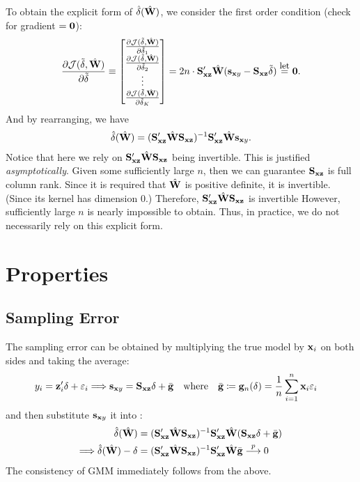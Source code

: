 \documentclass{article}
\begin{document}
To obtain the explicit form of $\hat{\delta}(\hat{\mathbf{W}})$,
we consider the first order condition (check for gradient $=\mathbf{0}$):
\begin{align*}
	\frac{\partial{\mathcal{J}(\tilde{\delta},\hat{\mathbf{W}})}}{\partial{\tilde{\delta}}}
	\equiv
	\begin{bmatrix}
		\frac{\partial{\mathcal{J}(\tilde{\delta},\hat{\mathbf{W}})}}{\partial{\tilde{\delta}_1}} \\
		\frac{\partial{\mathcal{J}(\tilde{\delta},\hat{\mathbf{W}})}}{\partial{\tilde{\delta}_2}} \\
		\vdots \\
		\frac{\partial{\mathcal{J}(\tilde{\delta},\hat{\mathbf{W}})}}{\partial{\tilde{\delta}_K}} \\
	\end{bmatrix}
	= 2n\cdot\mathbf{S}_{\mathbf{x}\mathbf{z}}'\hat{\mathbf{W}}(\mathbf{s}_{\mathbf{x} y}-\mathbf{S}_{\mathbf{x}\mathbf{z}}\tilde{\delta})
	\overset{\text{\small let}}{=} \mathbf{0}.
\end{align*}
And by rearranging, we have
\begin{align}\label{gmm_explicit_form}
	\hat{\delta}(\hat{\mathbf{W}}) = (\mathbf{S}_{\mathbf{x}\mathbf{z}}'\hat{\mathbf{W}}\mathbf{S}_{\mathbf{x}\mathbf{z}})^{-1}\mathbf{S}_{\mathbf{x}\mathbf{z}}'\hat{\mathbf{W}}\mathbf{s}_{\mathbf{x} y}.
\end{align}
Notice that here we rely on $\mathbf{S}_{\mathbf{x}\mathbf{z}}'\hat{\mathbf{W}}\mathbf{S}_{\mathbf{x}\mathbf{z}}$ being invertible.
This is justified \emph{asymptotically}.
Given some sufficiently large $n$,
then we can guarantee $\mathbf{S}_{\mathbf{x}\mathbf{z}}$ is full column rank.
Since it is required that $\hat{\mathbf{W}}$ is positive definite, it is invertible.
(Since its kernel has dimension $0$.)
Therefore, $\mathbf{S}_{\mathbf{x}\mathbf{z}}'\hat{\mathbf{W}}\mathbf{S}_{\mathbf{x}\mathbf{z}}$ is invertible
However, sufficiently large $n$ is nearly impossible to obtain.
Thus, in practice, we do not necessarily rely on this explicit form.

\section{Properties}

\subsection{Sampling Error}

The sampling error can be obtained by multiplying the true model 
by $\mathbf{x}_i$ on both sides and taking the average:
\begin{align*}
	y_i = \mathbf{z}_i'\delta+\varepsilon_i
	&\Longrightarrow \mathbf{s}_{\mathbf{x} y} = \mathbf{S}_{\mathbf{x}\mathbf{z}}\delta + \bar{\mathbf{g}}
	\quad\text{where}\quad
	\bar{\mathbf{g}} \coloneqq \mathbf{g}_n(\delta) = \frac1n\sum_{i=1}^{n}\mathbf{x}_i\varepsilon_i
\end{align*}
and then substitute $\mathbf{s}_{\mathbf{x} y}$ it into :
\begin{align}
	\hat{\delta}(\hat{\mathbf{W}})
	&= (\mathbf{S}_{\mathbf{x}\mathbf{z}}'\hat{\mathbf{W}}\mathbf{S}_{\mathbf{x}\mathbf{z}})^{-1}\mathbf{S}_{\mathbf{x}\mathbf{z}}'\hat{\mathbf{W}}(\mathbf{S}_{\mathbf{x}\mathbf{z}}\delta + \bar{\mathbf{g}}) \nonumber \\
	\Longrightarrow \hat{\delta}(\hat{\mathbf{W}}) - \delta
	&= (\mathbf{S}_{\mathbf{x}\mathbf{z}}'\hat{\mathbf{W}}\mathbf{S}_{\mathbf{x}\mathbf{z}})^{-1}\mathbf{S}_{\mathbf{x}\mathbf{z}}'\hat{\mathbf{W}}\bar{\mathbf{g}} \overset{p}{\longrightarrow} 0 \label{consistent}
\end{align}
The consistency of GMM immediately follows from the above.
\end{document}
